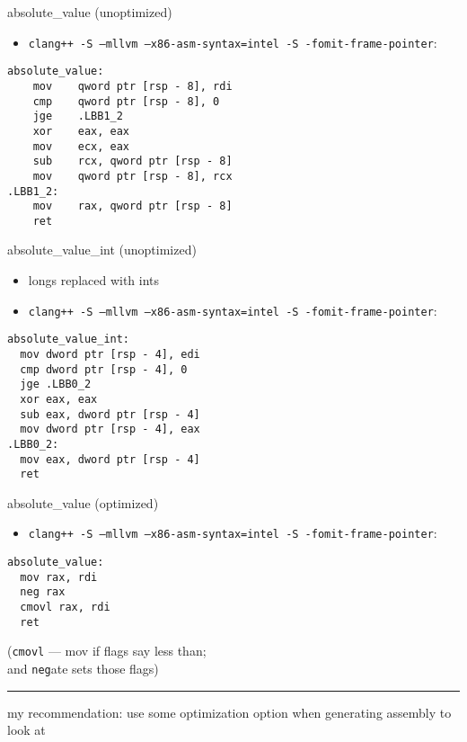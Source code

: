 \begin{frame}[fragile,label=absValueIntelUnopt]{absolute\_value (unoptimized)}
\lstset{
    language=myasm
}
\begin{itemize}
    \item \texttt{clang++ -S --mllvm --x86-asm-syntax=intel -S -fomit-frame-pointer}:
\end{itemize}
\begin{lstlisting}
absolute_value:
    mov    qword ptr [rsp - 8], rdi
    cmp    qword ptr [rsp - 8], 0
    jge    .LBB1_2
    xor    eax, eax
    mov    ecx, eax
    sub    rcx, qword ptr [rsp - 8]
    mov    qword ptr [rsp - 8], rcx
.LBB1_2:
    mov    rax, qword ptr [rsp - 8]
    ret
\end{lstlisting}
\end{frame}
\begin{frame}[fragile,label=absValueInt]{absolute\_value\_int (unoptimized)}
\lstset{
    language=myasm
}
\begin{itemize}
    \item longs replaced with ints
    \item \texttt{clang++ -S --mllvm --x86-asm-syntax=intel -S -fomit-frame-pointer}:
\end{itemize}
\begin{lstlisting}
absolute_value_int:
  mov dword ptr [rsp - 4], edi
  cmp dword ptr [rsp - 4], 0
  jge .LBB0_2
  xor eax, eax
  sub eax, dword ptr [rsp - 4]
  mov dword ptr [rsp - 4], eax
.LBB0_2:
  mov eax, dword ptr [rsp - 4]
  ret
\end{lstlisting}
\end{frame}



\begin{frame}[fragile,label=absValueO2]{absolute\_value (optimized)}
\lstset{
    language=myasm
}
\begin{itemize}
    \item \texttt{clang++ -S  --mllvm --x86-asm-syntax=intel -S -fomit-frame-pointer}:
\end{itemize}
\begin{lstlisting}
absolute_value:
  mov rax, rdi
  neg rax
  cmovl rax, rdi    
  ret
\end{lstlisting}
(\texttt{cmovl} --- mov if flags say less than; \\
and \texttt{neg}ate sets those flags)
\hrule
my recommendation: use some optimization option when generating assembly to look at
\end{frame}

